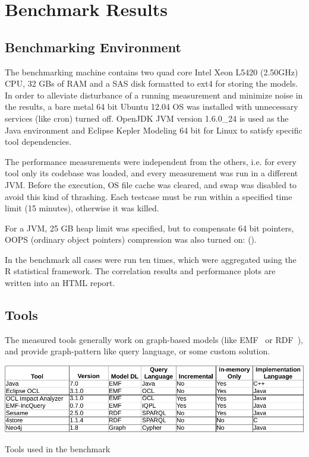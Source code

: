\chapter{Benchmark Results}

\section{Benchmarking Environment}
\label{sec:environment}

The benchmarking machine contains two quad core Intel Xeon L5420 (2.50GHz) CPU, 32 GBs of RAM and a SAS disk formatted to ext4 for storing the models. In order to alleviate disturbance of a running measurement and minimize noise in the results, a bare metal 64 bit Ubuntu 12.04 OS was installed with unnecessary services (like cron) turned off. OpenJDK JVM version 1.6.0\_24 is used as the Java environment and Eclipse Kepler Modeling 64 bit for Linux to satisfy specific tool dependencies.

The performance measurements were independent from the others, i.e. for every tool only its codebase was loaded, and every measurement was run in a different JVM. Before the execution, OS file cache was cleared, and swap was disabled to avoid this kind of thrashing. Each testcase must be run within a specified time limit (15 minutes), otherwise it was killed.

For a JVM, 25 GB heap limit was specified, but to compensate 64 bit pointers, OOPS (ordinary object pointers) compression was also turned on: ().

In the benchmark all cases were run ten times, which were aggregated using the R statistical framework. The correlation results and performance plots are written into an HTML report.

\section{Tools}
The measured tools generally work on graph-based models (like EMF~\cite{EMF} or RDF~\cite{RDF}), and provide graph-pattern like query language, or some custom solution.

\begin{table}[Hh]
\includegraphics[width=\columnwidth]{figures/tools.pdf}
\caption{Tools used in the benchmark}
\label{table:tools}
\end{table}

